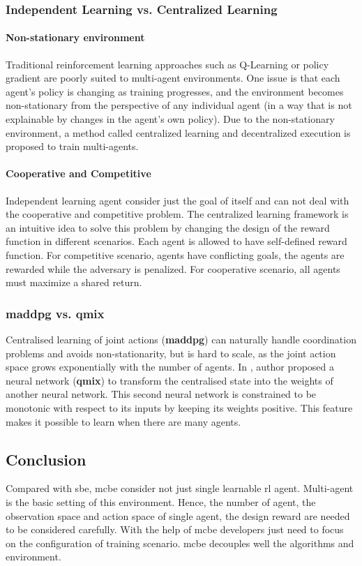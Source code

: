 \subsubsection{Independent Learning vs. Centralized Learning}
\paragraph{Non-stationary environment}
Traditional reinforcement learning approaches such as Q-Learning or policy gradient
are poorly suited to multi-agent environments\parencite{maddpg2017, Rashid2018, en13010123}. One issue is that each agent’s policy is changing as training progresses, and the environment becomes non-stationary from the perspective of any individual agent (in a way that is not explainable by changes in the agent’s own policy).
Due to the non-stationary environment, a method called centralized learning and decentralized execution is proposed to train multi-agents.
\paragraph{Cooperative and Competitive} Independent learning agent consider just the goal of itself and can not deal with the cooperative and competitive problem. The centralized learning framework is an intuitive idea to solve this problem by changing the design of the reward function in different scenarios. Each agent is allowed to have self-defined reward function. For competitive scenario, agents
have conflicting goals, the agents are rewarded while the adversary is penalized. For cooperative scenario, all agents must maximize a shared return.

\subsubsection{\gls{maddpg} vs. \gls{qmix}}
Centralised learning of joint actions (\textbf{\gls{maddpg}}) can naturally handle coordination problems and avoids non-stationarity, but is hard to scale, as the joint action space grows exponentially with the number of agents. In \parencite{Rashid2018}, author proposed a neural network (\textbf{\gls{qmix}}) to transform the centralised state into the weights of another neural network. This second neural network is constrained to be monotonic with respect to its inputs by keeping its weights positive. This feature makes it possible to learn when there are many agents.

\subsection{Conclusion}
Compared with \gls{sbe}, \gls{mcbe} consider not just single learnable \gls{rl} agent. Multi-agent is the basic setting of this environment. Hence, the number of agent, the observation space and action space of single agent, the design reward are needed to be considered carefully. With the help of \gls{mcbe} developers just need to focus on the configuration of training scenario. \gls{mcbe} decouples well the algorithms and environment. 